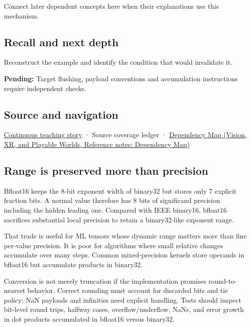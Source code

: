 Connect later dependent concepts here when their explanations use this mechanism.

\subsection{Recall and next depth}\label{appendix-18b8dd966b5d-recall-and-next-depth}

\hypertarget{appendix-18b8dd966b5d-recall-and-next-depth}{}

Reconstruct the example and identify the condition that would invalidate it.

\textbf{Pending:} Target flushing, payload conventions and accumulation instructions require independent checks.

\subsection{Source and navigation}\label{appendix-18b8dd966b5d-source-and-navigation}

\hypertarget{appendix-18b8dd966b5d-source-and-navigation}{}

\hyperref[01-foundations-i-ch001-choosing-what-information-to-keep]{Continuous teaching story} · {Source coverage ledger} · \href{../07-Vision-XR-and-Playable-Worlds/main.pdf\#nameddest=appendix-4ad47bdd269a}{Dependency Map (Vision, XR, and Playable Worlds, Reference notes: Dependency Map)}

\subsection{Range is preserved more than precision}\label{appendix-18b8dd966b5d-range-is-preserved-more-than-precision}

\hypertarget{appendix-18b8dd966b5d-range-is-preserved-more-than-precision}{}

Bfloat16 keeps the 8-bit exponent width of binary32 but stores only 7 explicit fraction bits. A normal value therefore has 8 bits of significand precision including the hidden leading one. Compared with IEEE binary16, bfloat16 sacrifices substantial local precision to retain a binary32-like exponent range.

That trade is useful for ML tensors whose dynamic range matters more than fine per-value precision. It is poor for algorithms where small relative changes accumulate over many steps. Common mixed-precision kernels store operands in bfloat16 but accumulate products in binary32.

Conversion is not merely truncation if the implementation promises round-to-nearest behavior. Correct rounding must account for discarded bits and tie policy; NaN payloads and infinities need explicit handling. Tests should inspect bit-level round trips, halfway cases, overflow/underflow, NaNs, and error growth in dot products accumulated in bfloat16 versus binary32.
